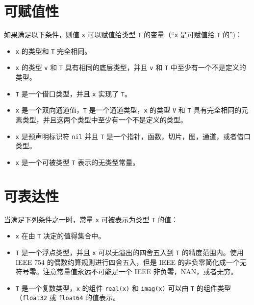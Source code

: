\section{可赋值性}
如果满足以下条件，则值 \lstinline|x| 可以赋值给类型 \lstinline|T| 的变量（``\lstinline|x| 是可赋值给 \lstinline|T| 的'')：
\begin{itemize}
\item \lstinline|x| 的类型和 \lstinline|T| 完全相同。
\item \lstinline|x| 的类型 \lstinline|v| 和 \lstinline|T| 具有相同的底层类型，并且 \lstinline|v| 和 \lstinline|T| 中至少有一个不是定义的类型。
\item \lstinline|T| 是一个借口类型，并且 \lstinline|x| 实现了 \lstinline|T|。
\item \lstinline|x| 是一个双向通道值，\lstinline|T| 是一个通道类型，\lstinline|x| 的类型 \lstinline|V| 和 \lstinline|T| 具有完全相同的元素类型，并且这两个类型中至少有一个不是定义的类型。
\item \lstinline|x| 是预声明标识符 \lstinline|nil| 并且 \lstinline|T| 是一个指针，函数，切片，图，通道，或者借口类型。
\item \lstinline|x| 是一个可被类型 \lstinline|T| 表示的无类型常量。
\end{itemize}


\section{可表达性}
当满足下列条件之一时，常量 \lstinline|x| 可被表示为类型 \lstinline|T| 的值：
\begin{itemize}
\item \lstinline|x| 在由 \lstinline|T| 决定的值得集合中。
\item  \lstinline|T| 是一个浮点类型，并且 \lstinline|x| 可以无溢出的四舍五入到 \lstinline|T| 的精度范围内。使用 IEEE 754 的偶数约算规则进行四舍五入，但是 IEEE 的非负零简化成一个无符号零。注意常量值永远不可能是一个 IEEE 非负零，NAN，或者无穷。
\item \lstinline|T| 是一个复数类型，\lstinline|x| 的组件 \lstinline|real(x)| 和 \lstinline|imag(x)| 可以由 \lstinline|T| 的组件类型（\lstinline|float32| 或 \lstinline|float64| 的值表示。
\end{itemize}

